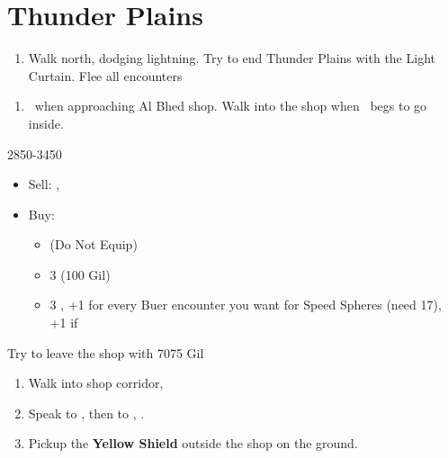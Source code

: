 \chapter{Thunder Plains}

\begin{enumerate}
	\item Walk north, dodging lightning. Try to end Thunder Plains with the Light Curtain. Flee all encounters
\end{enumerate}
\begin{enumerate}[resume]
	\item \sd\ when approaching Al Bhed shop. Walk into the shop when \rikku\ begs to go inside.
\end{enumerate}
\begin{shop}{2850-3450}
	\begin{itemize}
		\item Sell: \longsword{}, \katana{}
		\item Buy:
		      \begin{itemize}
			      \item \shimmeringblade{} (Do Not Equip)
			      \item 3 \phoenixdown{} (100 Gil)
			      \item 3 \grenade{}, +1 for every Buer encounter you want for Speed Spheres (need 17), +1 if \blitzloss
		      \end{itemize}
	\end{itemize}
	Try to leave the shop with 7075 Gil
\end{shop}
\begin{enumerate}[resume]
	\item Walk into shop corridor, \cs[2:00]
	\item Speak to \auron, then to \rikku, \sd.
	\item Pickup the \textbf{Yellow Shield} outside the shop on the ground.
\end{enumerate}


